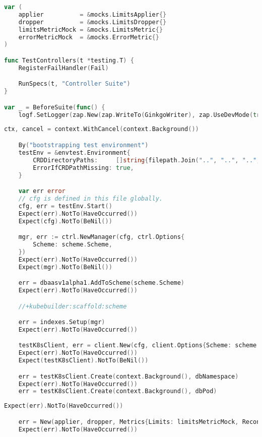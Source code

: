 \begin{appendices}
\begin{lstlisting}[language=Go,label=lst:int1, caption={Интеграционный тест}]
var (
	applier          = &mocks.LimitsApplier{}
	dropper          = &mocks.LimitsDropper{}
	limitsMetricMock = &mocks.LimitsMetric{}
	errorMetricMock  = &mocks.ErrorMetric{}
)

func TestControllers(t *testing.T) {
	RegisterFailHandler(Fail)

	RunSpecs(t, "Controller Suite")
}

var _ = BeforeSuite(func() {
	logf.SetLogger(zap.New(zap.WriteTo(GinkgoWriter), zap.UseDevMode(true)))
\end{lstlisting}

\begin{lstlisting}[language=Go,label=lst:int2, caption={Интеграционный тест (продолжение листинга~\ref{lst:int1})}]
	ctx, cancel = context.WithCancel(context.Background())

	By("bootstrapping test environment")
	testEnv = &envtest.Environment{
		CRDDirectoryPaths:     []string{filepath.Join("..", "..", "..", "config", "crd", "bases")},
		ErrorIfCRDPathMissing: true,
	}

	var err error
	// cfg is defined in this file globally.
	cfg, err = testEnv.Start()
	Expect(err).NotTo(HaveOccurred())
	Expect(cfg).NotTo(BeNil())

	mgr, err := ctrl.NewManager(cfg, ctrl.Options{
		Scheme: scheme.Scheme,
	})
	Expect(err).NotTo(HaveOccurred())
	Expect(mgr).NotTo(BeNil())

	err = dbaasv1alpha1.AddToScheme(scheme.Scheme)
	Expect(err).NotTo(HaveOccurred())

	//+kubebuilder:scaffold:scheme

	err = indexes.Setup(mgr)
	Expect(err).NotTo(HaveOccurred())

	testK8sClient, err = client.New(cfg, client.Options{Scheme: scheme.Scheme})
	Expect(err).NotTo(HaveOccurred())
	Expect(testK8sClient).NotTo(BeNil())

	err = testK8sClient.Create(context.Background(), dbNamespace)
	Expect(err).NotTo(HaveOccurred())
	err = testK8sClient.Create(context.Background(), dbPod)
\end{lstlisting}

\begin{lstlisting}[language=Go,label=lst:int3, caption={Интеграционный тест (продолжение листинга~\ref{lst:int2})}]
	Expect(err).NotTo(HaveOccurred())

	err = New(applier, dropper, Metrics{Limits: limitsMetricMock, ReconcileErrors: errorMetricMock}).SetupWithManager(mgr)
	Expect(err).NotTo(HaveOccurred())


\end{lstlisting}
\end{appendices}
